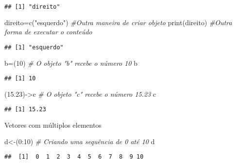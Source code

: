 \documentclass[
]{book}
\newenvironment{Shaded}{\begin{snugshade}}{\end{snugshade}}
\newcommand{\CommentTok}[1]{\textcolor[rgb]{0.56,0.35,0.01}{\textit{#1}}}
\newcommand{\DecValTok}[1]{\textcolor[rgb]{0.00,0.00,0.81}{#1}}
\newcommand{\FloatTok}[1]{\textcolor[rgb]{0.00,0.00,0.81}{#1}}
\newcommand{\FunctionTok}[1]{\textcolor[rgb]{0.00,0.00,0.00}{#1}}
\newcommand{\NormalTok}[1]{#1}
\newcommand{\OtherTok}[1]{\textcolor[rgb]{0.56,0.35,0.01}{#1}}
\newcommand{\SpecialCharTok}[1]{\textcolor[rgb]{0.00,0.00,0.00}{#1}}
\newcommand{\StringTok}[1]{\textcolor[rgb]{0.31,0.60,0.02}{#1}}
\begin{document}
\begin{verbatim}
## [1] "direito"
\end{verbatim}

\begin{Shaded}
\begin{Highlighting}[]
\NormalTok{direito}\OtherTok{=}\FunctionTok{c}\NormalTok{(}\StringTok{"esquerdo"}\NormalTok{) }\CommentTok{\#Outra maneira de criar objeto  }
\FunctionTok{print}\NormalTok{(direito) }\CommentTok{\#Outra forma de executar o conteúdo}
\end{Highlighting}
\end{Shaded}

\begin{verbatim}
## [1] "esquerdo"
\end{verbatim}

\begin{Shaded}
\begin{Highlighting}[]
\NormalTok{b}\OtherTok{=}\NormalTok{(}\DecValTok{10}\NormalTok{) }\CommentTok{\# O objeto "b" recebe o número 10}
\NormalTok{b}
\end{Highlighting}
\end{Shaded}

\begin{verbatim}
## [1] 10
\end{verbatim}

\begin{Shaded}
\begin{Highlighting}[]
\NormalTok{(}\FloatTok{15.23}\NormalTok{)}\OtherTok{{-}\textgreater{}}\NormalTok{c }\CommentTok{\# O objeto "c" recebe o número 15.23}
\NormalTok{c}
\end{Highlighting}
\end{Shaded}

\begin{verbatim}
## [1] 15.23
\end{verbatim}

Vetores com múltiplos elementos

\begin{Shaded}
\begin{Highlighting}[]
\NormalTok{d}\OtherTok{\textless{}{-}}\NormalTok{(}\DecValTok{0}\SpecialCharTok{:}\DecValTok{10}\NormalTok{) }\CommentTok{\# Criando uma sequência de 0 até 10}
\NormalTok{d}
\end{Highlighting}
\end{Shaded}

\begin{verbatim}
##  [1]  0  1  2  3  4  5  6  7  8  9 10
\end{verbatim}
\end{document}
